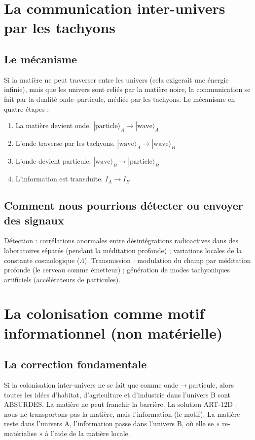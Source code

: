 \section{La communication inter-univers par les tachyons}
\subsection{Le mécanisme}
Si la matière ne peut traverser entre les univers (cela exigerait une énergie infinie), mais que les univers sont reliés par la matière noire, la communication se fait par la dualité onde--particule, médiée par les tachyons. Le mécanisme en quatre étapes :
\begin{enumerate}
    \item La matière devient onde. $|\text{particle}\rangle_A \to |\text{wave}\rangle_A$
    \item L'onde traverse par les tachyons. $|\text{wave}\rangle_A \to |\text{wave}\rangle_B$
    \item L'onde devient particule. $|\text{wave}\rangle_B \to |\text{particle}\rangle_B$
    \item L'information est transduite. $I_A \to I_B$
\end{enumerate}

\subsection{Comment nous pourrions détecter ou envoyer des signaux}
Détection : corrélations anormales entre désintégrations radioactives dans des laboratoires séparés (pendant la méditation profonde) ; variations locales de la constante cosmologique ($\Lambda$). Transmission : modulation du champ par méditation profonde (le cerveau comme émetteur) ; génération de modes tachyoniques artificiels (accélérateurs de particules).

\section{La colonisation comme motif informationnel (non matérielle)}
\subsection{La correction fondamentale}
Si la colonisation inter-univers ne se fait que comme onde$\to$particule, alors toutes les idées d'habitat, d'agriculture et d'industrie dans l'univers B sont ABSURDES. La matière ne peut franchir la barrière. La solution ART-12D : nous ne transportons pas la matière, mais l'information (le motif). La matière reste dans l'univers A, l'information passe dans l'univers B, où elle se « re-matérialise » à l'aide de la matière locale.

